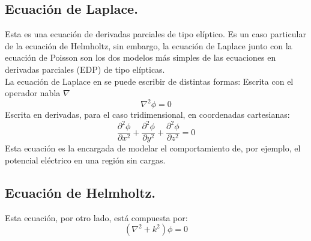\documentclass[11pt]{article}
\begin{document}
\subsection{Ecuación de Laplace.}
Esta es una ecuación de derivadas parciales de tipo elíptico. Es un caso particular de la ecuación de Helmholtz, sin embargo, la ecuación de Laplace junto con la ecuación de Poisson son los dos modelos más simples de las ecuaciones en derivadas parciales (EDP) de tipo elípticas.\\
La ecuación de Laplace en se puede escribir de distintas formas:
Escrita con el operador nabla $\nabla$
\begin{equation}
\nabla^2\phi=0
\end{equation}
Escrita en derivadas, para el caso tridimensional, en coordenadas cartesianas:
\begin{equation}
\frac{\partial^2 \phi}{\partial x^2}+\frac{\partial^2 \phi}{\partial y^2}+\frac{\partial^2 \phi}{\partial z^2}=0
\end{equation}
Esta ecuación es la encargada de modelar el comportamiento de, por ejemplo, el potencial eléctrico en una región sin cargas.
\subsection{Ecuación de Helmholtz.}
Esta ecuación, por otro lado, está compuesta por:
\begin{equation}
(\nabla^2+k^2)\phi=0
\end{equation}
\newpage
\end{document}
